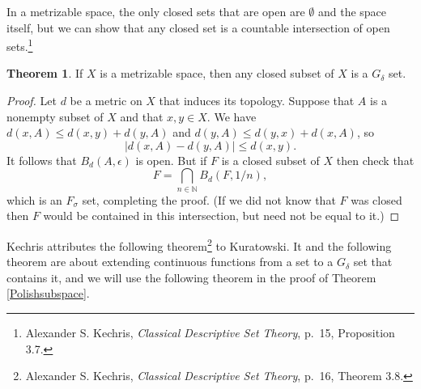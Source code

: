 \documentclass{article}
\theoremstyle{definition}
\newtheorem{theorem}{Theorem}
\theoremstyle{definition}
\begin{document}
In a metrizable space, the only closed sets that are open are $\emptyset$ and the space itself, but we can show that
any closed set is a countable intersection of open sets.\footnote{Alexander S. Kechris, {\em Classical Descriptive Set Theory}, p.~15, Proposition 3.7.}

\begin{theorem}
If $X$ is a metrizable space, then any closed subset of $X$ is a $G_\delta$ set.
\label{closedGdelta}
\end{theorem}
\begin{proof}
Let $d$ be a metric on $X$ that induces its topology. Suppose that $A$ is a nonempty subset of $X$ and that $x,y \in X$. We have
$d(x,A) \leq d(x,y)+d(y,A)$ and $d(y,A) \leq d(y,x) + d(x,A)$, so
\[
|d(x,A) - d(y,A)| \leq d(x,y).
\]
It follows that $B_d(A,\epsilon)$ is open. But if $F$ is a closed subset of $X$ then check that 
\[
F = \bigcap_{n \in \mathbb{N}} B_d(F,1/n),
\]
which is an $F_\sigma$ set, completing the proof. (If we did not know that $F$ was closed then  $F$ would be contained in this intersection, but
need not be equal to it.)
\end{proof}

Kechris attributes the following theorem\footnote{Alexander S. Kechris, {\em Classical Descriptive Set Theory}, p.~16,
Theorem 3.8.}
 to Kuratowski. It and the following theorem are about extending continuous functions from a set to a $G_\delta$ 
set that contains it, and  we will use the following theorem in the proof of Theorem \ref{Polishsubspace}.
\end{document}
